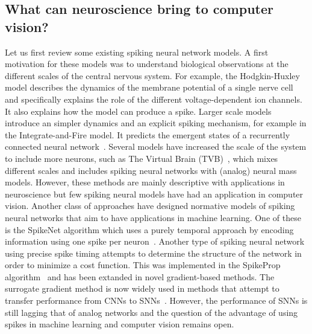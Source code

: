 \documentclass[default]{sn-jnl}%
\theoremstyle{thmstyleone}%
\theoremstyle{thmstyletwo}%
\theoremstyle{thmstylethree}%
\begin{document}
\subsection{What can neuroscience bring to computer vision?}%
Let us first review some existing spiking neural network models. A first motivation for these models was to understand biological observations at the different scales of the central nervous system. For example, the Hodgkin-Huxley model describes the dynamics of the membrane potential of a single nerve cell and specifically explains the role of the different voltage-dependent ion channels. It also explains how the model can produce a spike. Larger scale models introduce an simpler dynamics and an explicit spiking mechanism, for example in the Integrate-and-Fire model. It predicts the emergent states of a recurrently connected neural network~\citep{brunel_phase_2000}. Several models have increased the scale of the system to include more neurons, such as The Virtual Brain (TVB)~\citep{sanz_leon_virtual_2013}, which mixes different scales and includes spiking neural networks with (analog) neural mass models. However, these methods are mainly descriptive with applications in neuroscience but few spiking neural models have had an application in computer vision. Another class of approaches have designed normative models of spiking neural networks that aim to have applications in machine learning. One of these is the SpikeNet algorithm which uses a purely temporal approach by encoding information using one spike per neuron~\citep{delorme_spikenet_1999}. Another type of spiking neural network using precise spike timing attempts to determine the structure of the network in order to minimize a cost function. This was implemented in the SpikeProp algorithm~\citep{bohte_error-backpropagation_2002} and has been extanded in novel gradient-based methods. The surrogate gradient method is now widely used in methods that attempt to transfer performance from CNNs to SNNs~\citep{zenke_remarkable_2021}. However, the performance of SNNs is still lagging that of analog networks and the question of the advantage of using spikes in machine learning and computer vision remains open.
\end{document}
